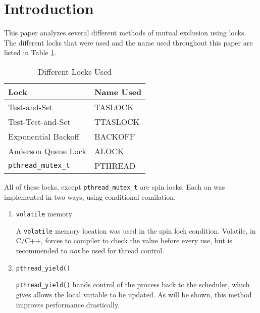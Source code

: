\section{Introduction}

This paper analyzes several different methods of mutual exclusion using locks.
The different locks that were used and the name used throughout this paper are listed in Table \ref{table:locks}.

\begin{table}[hp]
    \caption{Different Locks Used}
    \begin{center}
        \begin{tabular}{|l|l|}
            \hline Lock & Name Used \\
            \hline Test-and-Set & TASLOCK \\
            \hline Test-Test-and-Set & TTASLOCK \\
            \hline Exponential Backoff & BACKOFF \\
            \hline Anderson Queue Lock & ALOCK \\
            \hline \verb+pthread_mutex_t+ & PTHREAD \\
            \hline
        \end{tabular}
    \end{center}
    \label{table:locks}
\end{table}

All of these locks, except \verb+pthread_mutex_t+ are spin locks.
Each on was implemented in two ways, using conditional comilation.
\begin{enumerate}
    \item \verb+volatile+ memory

        A \verb+volatile+ memory location was used in the spin lock condition.
        Volatile, in C/C++, forces to compiler to check the value before every use, but is recommended to \emph{not} be used for thread control.
    \item \verb+pthread_yield()+

        \verb+pthread_yield()+ hands control of the process back to the scheduler, which gives allows the local variable to be updated.
        As will be shown, this method improves performance drastically.
\end{enumerate}

